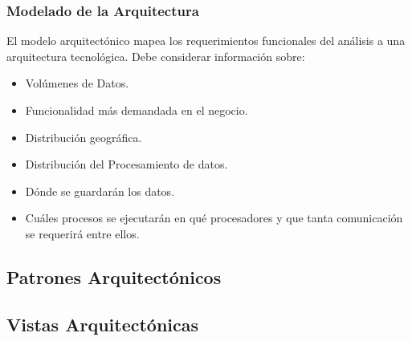 \subsubsection{Modelado de la Arquitectura}
El modelo arquitectónico mapea los requerimientos funcionales del análisis a una arquitectura tecnológica. Debe considerar información sobre:
\begin{itemize}
	\item Volúmenes de Datos.
	\item Funcionalidad más demandada en el negocio.
	\item Distribución geográfica.
	\item Distribución del Procesamiento de datos.
	\item Dónde se guardarán los datos.
	\item Cuáles procesos se ejecutarán en qué procesadores y que tanta comunicación se requerirá entre ellos.
\end{itemize}
\subsection{Patrones Arquitectónicos}
\subsection{Vistas Arquitectónicas}
